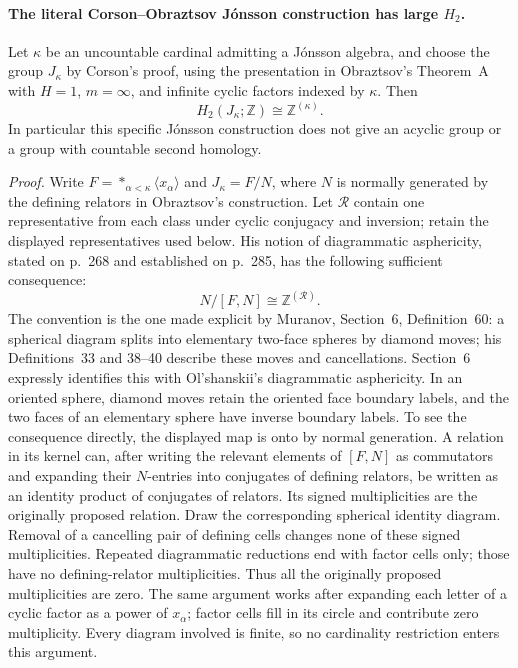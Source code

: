 \paragraph{The literal Corson--Obraztsov J\'onsson construction has large $H_2$.}
Let $\kappa$ be an uncountable cardinal admitting a J\'onsson algebra,
and choose the group $J_\kappa$ by Corson's proof, using the presentation
in Obraztsov's Theorem~A with $H=1$, $m=\infty$, and infinite cyclic
factors indexed by $\kappa$. Then
\[
                 H_2(J_\kappa;\mathbb Z)\cong\mathbb Z^{(\kappa)}.
\]
In particular this specific J\'onsson construction does not give an
acyclic group or a group with countable second homology.

\emph{Proof.}
Write $F=*_{\alpha<\kappa}\langle x_\alpha\rangle$ and
$J_\kappa=F/N$, where $N$ is normally generated by the defining
relators in Obraztsov's construction. Let $\mathcal R$ contain one
representative from each class under cyclic conjugacy and inversion;
retain the displayed representatives used below. His notion of
diagrammatic asphericity, stated on p.~268 and established on p.~285,
has the following sufficient consequence:
\begin{equation}\label{CD:EJonsson:relationcoinvariants}
                  N/[F,N]\cong\mathbb Z^{(\mathcal R)}.
\end{equation}
The convention is the one made explicit by Muranov, Section~6,
Definition~60: a spherical diagram splits into elementary two-face
spheres by diamond moves; his Definitions~33 and 38--40 describe
these moves and cancellations. Section~6 expressly identifies this
with Ol'shanskii's diagrammatic asphericity. In an oriented sphere,
diamond moves retain the oriented face boundary labels, and the
two faces of an elementary sphere have inverse boundary labels.
To see the consequence directly,
the displayed map is onto by normal generation. A relation in its
kernel can, after writing the relevant elements of $[F,N]$ as
commutators and expanding their $N$-entries into conjugates of
defining relators, be written as an identity product of conjugates
of relators. Its signed multiplicities are the originally proposed
relation. Draw the corresponding spherical identity diagram.
Removal of a cancelling pair of defining cells changes none of
these signed multiplicities. Repeated diagrammatic reductions end
with factor cells only; those have no defining-relator multiplicities.
Thus all the originally proposed multiplicities are zero. The
same argument works after expanding each letter of a cyclic factor
as a power of $x_\alpha$; factor cells fill in its circle and contribute
zero multiplicity. Every diagram involved is finite, so no
cardinality restriction enters this argument.

